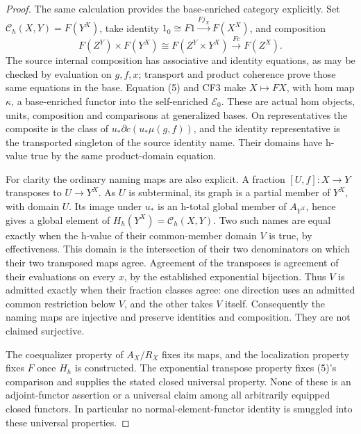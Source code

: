 \begin{proof}
The same calculation provides the base-enriched category explicitly.
Set \(\mathcal C_h(X,Y)=F(Y^X)\), take identity
\(1_0\cong F1\xrightarrow{Fj_X}F(X^X)\), and composition
\[
 F(Z^Y)\times F(Y^X)\cong F(Z^Y\times Y^X)
                                      \xrightarrow{Fc}F(Z^X).
\]
The source internal composition has associative and identity equations,
as may be checked by evaluation on \(g,f,x\); transport and product
coherence prove those same equations in the base. Equation (5) and CF3
make \(X\mapsto FX\), with hom map \(\kappa\), a base-enriched
functor into the self-enriched \(\mathcal E_0\). These are actual
hom objects, units, composition and comparisons at generalized bases.
On representatives the composite is the class of
\(u_*\partial c(u_*\mu(g,f))\), and the identity representative
is the transported singleton of the source identity name. Their
domains have h-value true by the same product-domain equation.

For clarity the ordinary naming maps are also explicit. A fraction
\([U,f]:X\to Y\) transposes to \(U\to Y^X\). As \(U\)
is subterminal, its graph is a partial member of \(Y^X\), with
domain \(U\). Its image under \(u_*\) is an h-total global
member of \(A_{Y^X}\), hence gives a global element of
\(H_h(Y^X)=\mathcal C_h(X,Y)\). Two such names are equal
exactly when the h-value of their common-member domain \(V\)
is true, by effectiveness. This domain is the intersection of their
two denominators on which their two transposed maps agree. Agreement
of the transposes is agreement of their evaluations on every \(x\),
by the established exponential bijection. Thus \(V\) is admitted
exactly when their fraction classes agree: one direction uses an
admitted common restriction below \(V\), and the other takes
\(V\) itself. Consequently the naming maps are injective and
preserve identities and composition. They are not claimed surjective.

The coequalizer property of \(A_X/R_X\) fixes its maps, and the
localization property fixes \(F\) once \(H_h\) is constructed.
The exponential transpose property fixes (5)'s comparison and supplies
the stated closed universal property. None of these is an adjoint-functor
assertion or a universal claim among all arbitrarily equipped closed
functors. In particular no normal-element-functor identity is smuggled
into these universal properties.
\end{proof}

